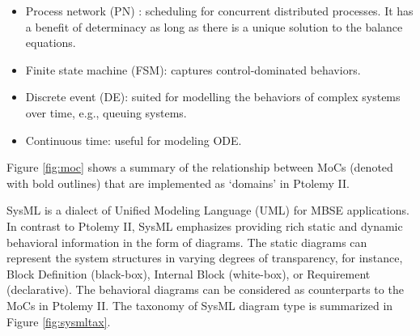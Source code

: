 \documentclass[journal,onecolumn]{IEEEtran} %
\begin{document}
\begin{itemize}

  \item Process network (PN) \cite{Tripakis2014} : scheduling for concurrent distributed processes. It has a benefit of determinacy as long as there is a unique solution to the balance equations. 

  \item Finite state machine (FSM): captures control-dominated behaviors. 
  
  \item Discrete event (DE): suited for modelling the behaviors of complex systems over time, e.g., queuing systems.
  
  \item Continuous time: useful for modeling ODE.

\end{itemize}

Figure \ref{fig:moc} shows a summary of the relationship between MoCs (denoted with bold outlines) that are implemented as `domains' in Ptolemy II.


SysML is a dialect of Unified Modeling Language (UML) for MBSE applications. In contrast to Ptolemy II, SysML emphasizes providing rich static and dynamic behavioral information in the form of diagrams. The static diagrams can represent the system structures in varying degrees of transparency, for instance, Block Definition (black-box), Internal Block (white-box), or Requirement (declarative). The behavioral diagrams can be considered as counterparts to the MoCs in Ptolemy II. The taxonomy of SysML diagram type is summarized in Figure \ref{fig:sysmltax}.
\end{document}
